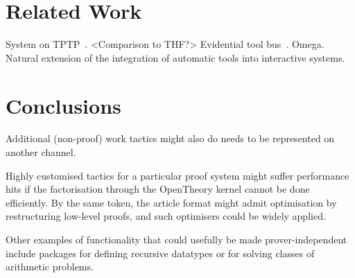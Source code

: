 \documentclass{llncs}
\begin{document}
\section{Related Work}

System on TPTP~\cite{DBLP:conf/lpar/Sutcliffe10}.
<Comparison to THF?>
Evidential tool bus~\cite{DBLP:conf/icfem/Rushby05,fk:etb}.
Omega.
Natural extension of the integration of automatic tools into interactive systems.

\section{Conclusions}
Additional (non-proof) work tactics might also do needs to be represented on another channel.

Highly customised tactics for a particular proof system might suffer performance hits if the factorisation through the OpenTheory kernel cannot be done efficiently.
By the same token, the article format might admit optimisation by restructuring low-level proofs, and such optimisers could be widely applied.

Other examples of functionality that could usefully be made prover-independent include packages for defining recursive datatypes or for solving classes of arithmetic problems.



\end{document}
